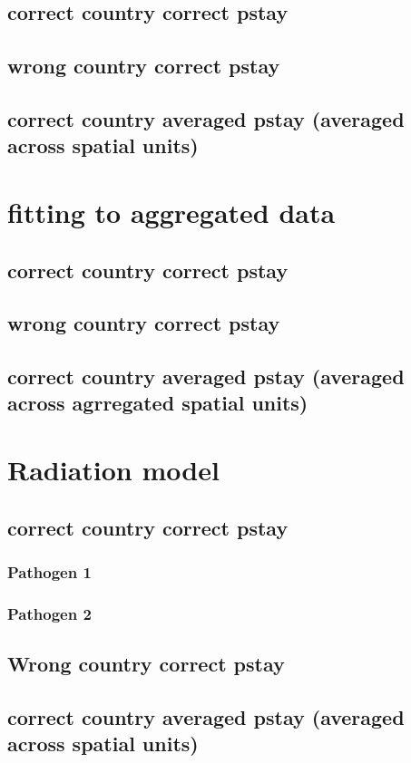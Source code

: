 \documentclass[a4paper,12pt]{article}
\begin{document}
\subsection{correct country correct pstay}
\subsection{wrong country correct pstay}
\subsection{correct country averaged pstay (averaged across spatial
  units)}
\section{fitting to aggregated data}
\subsection{correct country correct pstay}
\subsection{wrong country correct pstay}
\subsection{correct country averaged pstay (averaged across agrregated
  spatial units)}

\section{Radiation model}
\subsection{correct country correct pstay}
\subsubsection{Pathogen 1}
\subsubsection{Pathogen 2}
\subsection{Wrong country correct pstay}
\subsection{correct country averaged pstay (averaged across spatial
  units)}
\end{document}
